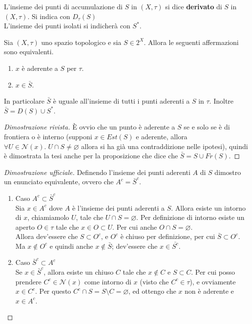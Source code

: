 \begin{definition}
	L'insieme dei punti di accumulazione di $S$ in $(X,\tau)$ si dice \textbf{derivato} di $S$ in $(X, \tau)$. 
	Si indica con $D_\tau (S)$\\
	L'insieme dei punti isolati si indicherà con $S^*$.
\end{definition}

\begin{theorem}
	\label{prop:aderent_points_are_in_closure}
	Sia $(X, \tau)$ uno spazio topologico e sia $S \in 2^X$. Allora le seguenti affermazioni sono equivalenti.
	\begin{enumerate}
		\item $x$ è aderente a $S$ per $\tau$.
		\item $x \in \bar{S}$. 
	\end{enumerate}
	In particolare $\bar{S}$ è uguale all'insieme di tutti i punti aderenti a $S$ in $\tau$. Inoltre $\bar{S} = D(S) \cup S^*$.
\end{theorem}
\begin{proof}[Dimostrazione rivista]
	 È ovvio che un punto è aderente a $S$ se e solo se è di frontiera o è interno (supponi $x \in Est(S)$ e aderente, allora $\forall U \in \mathcal{N}(x).\; U \cap S \neq \varnothing$ allora si ha già una contraddizione nelle ipotesi), quindi è dimostrata la tesi anche per la proposizione che dice che $\bar{S} = S \cup Fr(S)$.
\end{proof}
\begin{proof}[Dimostrazione ufficiale]
	Definendo l'insieme dei punti aderenti $A$ di $S$ dimostro un enunciato equivalente, ovvero che $A^c = \bar{S}^c$.
	\begin{enumerate}
		\item Caso $A^c \subset \bar{S}^c$ \\ Sia $x\in A^c$ dove $A$ è l'insieme dei punti aderenti a $S$. Allora esiste un intorno di $x$, chiamiamolo $U$, tale che $U \cap S = \varnothing$. Per definizione di intorno esiste un aperto $O \in \tau$ tale che $x \in O \subset U$. Per cui anche $O \cap S = \varnothing$. \\ Allora dev'essere che $S \subset O^c$,  e $O^c$ è chiuso per definizione, per cui $\bar{S} \subset O^c$. Ma $x \notin O^c$ e quindi anche $x \notin \bar{S}$; dev'essere che $x \in \bar{S^c}$.
		\item Caso $\bar{S}^c\subset A^c $ \\ Se $x \in \bar{S}^c$, allora esiste un chiuso $C$ tale che $x \notin C$ e $S \subset C$. Per cui posso prendere $C^c \in \mathcal{N}(x)$ come intorno di $x$ (visto che $C^c \in \tau$), e ovviamente $x \in C^c$. Per questo $C^c \cap S = S \setminus C = \varnothing$, ed ottengo che $x$ non è aderente e $x \in A^c$.
	\end{enumerate}
\end{proof}

